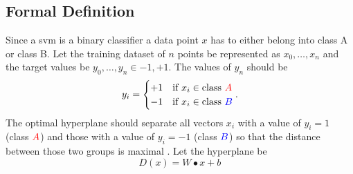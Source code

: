 \subsection*{Formal Definition}
Since a \Gls{svm} is a binary classifier a data point $x$ has to either belong into class A or class B. Let the training dataset of $n$ points be represented as $x_0,\dots,x_n$ and the target values be $y_0,\dots,y_n \in {-1,+1}$. The values of $y_n$ should be 
\begin{equation}
	y_i=
		\begin{cases}
		+1 & \text{if } x_i \in \text{class } {\color{red}A} \\
		-1 & \text{if } x_i \in \text{class } {\color{blue}B}
		\end{cases}.	
\end{equation}
The optimal hyperplane should separate all vectors $x_i$ with a value of $y_i=1$ {(class ${\color{red}A}$)} and those with a value of $y_i=-1$ {(class ${\color{blue}B}$)} so that the distance between those two groups is maximal \cite{Thome2012}. Let the hyperplane be
\begin{equation}
	D(x)=W \bullet x+b
\end{equation}

